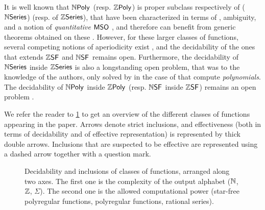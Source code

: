 It is well known that $\NPoly$ (resp. $\ZPoly$) is proper subclass respectively
of  ($\mathbb{N}\mathsf{Series}$) (resp. of 
$\mathbb{Z}\mathsf{Series}$), that have been characterized in terms of , ambiguity,
and a notion of \emph{quantitative} $\mathsf{MSO}$
\cite{schutzenberger1962,kreutzer2013}, and therefore can benefit from generic
theorems obtained on these \cite{berstel2011noncommutative}. However, for these
larger classes of functions, several competing notions of aperiodicity exist
\cite{droste2019aperiodic,reutenauer_series_1980,LOPEZ23b}, and the
decidability of the ones that extends $\ZSF$ and $\NSF$ remains open.
Furthermore, the decidability of $\mathbb{N}\mathsf{Series}$ inside $\mathbb{Z}\mathsf{Series}$ is also a longstanding
open problem, that was to the knowledge of the authors, only solved by
\textcite{KARH77} in the case of  that compute
\emph{polynomials}. The decidability of $\NPoly$ inside $\ZPoly$ (resp. $\NSF$
inside $\ZSF$) remains an open problem
\cite[see e.g.][Open question 5.55]{gaetanphd}.


We refer the reader to \cref{previously-known-inclusions:fig} to get an
overview of the different classes of functions appearing in the paper. Arrows
denote strict inclusions, and effectiveness (both in terms of decidability and
of effective representation) is represented by thick double arrows. Inclusions
that are suspected to be effective are represented using a dashed arrow
together with a question mark.


\begin{figure}
    
    \caption{
        Decidability and inclusions of classes of functions,
        arranged along two axes. The first one is the complexity
        of the output alphabet ($\mathbb{N}$, $\mathbb{Z}$, $\Sigma$). The second
        one is the allowed computational power
        (star-free polyregular functions, polyregular functions, 
        rational series).
    }
    \label{previously-known-inclusions:fig}
\end{figure}


